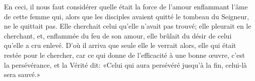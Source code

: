 En ceci, il nous faut considérer
		quelle était la force de l’amour enflammant l’âme de cette femme
	qui, alors que les disciples avaient quitté le tombeau du Seigneur,
	ne le quittait pas.
Elle cherchait celui qu’elle n’avait pas trouvé;
	elle pleurait en le cherchant, et, enflammée du feu de son amour,
	elle brûlait du désir de celui qu’elle a cru enlevé.
D’où il arriva que seule elle le verrait alors,
	elle qui était restée pour le chercher,
	car ce qui donne de l’efficacité à une bonne œuvre,
	c’est la persévérance, et la Vérité dit:
	«Celui qui aura persévéré jusqu’à la fin, celui-là sera sauvé.»
